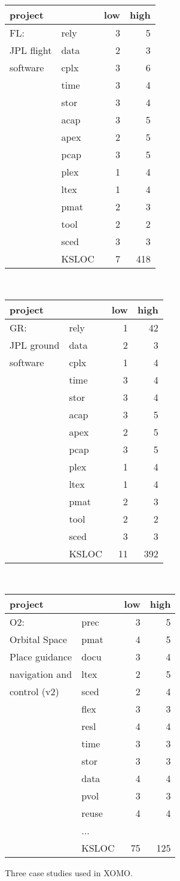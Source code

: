 \begin{figure}[!t]
\scriptsize
\begin{tabular}{l@{~}|l@{~}r@{~}r@{~}}
project&&low&high\\\hline
FL:&rely&3&5\\
JPL flight &data&2&3\\
software&cplx&3&6\\
&time&3&4\\
&stor&3&4\\
&acap&3&5\\
&apex&2&5\\
&pcap&3&5\\
&plex&1&4\\
&ltex&1&4\\
&pmat&2&3\\
&tool&2&2\\
&sced&3&3\\
&KSLOC&7&418
\end{tabular}~~~~~~~~~~~~~~~~~~~~~~\begin{tabular}{l@{~}|l@{~}r@{~}r@{~}}
project&&low&high\\\hline

GR:&rely&1&42\\
JPL ground &data&2&3\\
software&cplx&1&4\\
&time&3&4\\
&stor&3&4\\
&acap&3&5\\
&apex&2&5\\
&pcap&3&5\\
&plex&1&4\\
&ltex&1&4\\
&pmat&2&3\\
&tool&2&2\\
&sced&3&3\\
&KSLOC&11&392
\end{tabular}~~~~~~~~~~~~~~~~~~~~~~\begin{tabular}{l@{~}|l@{~}r@{~}r@{~}}
project&&low&high\\\hline
O2:&prec&3&5\\
Orbital Space&pmat&4&5\\
Place guidance&docu&3&4\\
navigation and&ltex&2&5\\
control (v2)&sced&2&4\\
&flex&3&3\\
&resl&4&4\\
&time&3&3\\
&stor&3&3\\
&data&4&4\\
&pvol&3&3\\
&reuse&4&4\\
&...&&\\
&KSLOC&75&125
\end{tabular}
\caption{Three case studies used in XOMO.}\label{fig:xomocases}
\end{figure}

